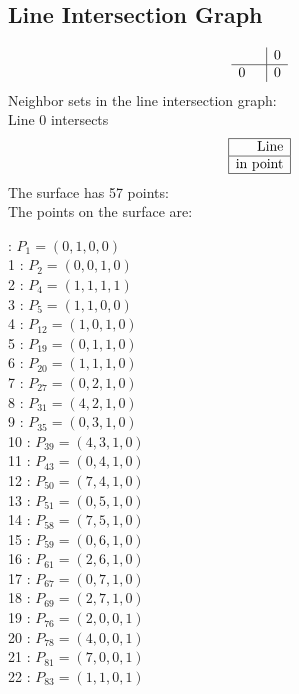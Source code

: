 \documentclass{article}
\begin{document}
{\subsection*{Line Intersection Graph}
{\arraycolsep=1pt
$$
\begin{array}{rr|*{1}r}
 &  & 0\\
\hline
0 &  & 0\\
\end{array}
$$
}%
Neighbor sets in the line intersection graph:\\
Line 0 intersects 
$$
\begin{array}{|r*{0}{|c}|}
\hline
\mbox{Line} \\
\hline
\mbox{in point} \\
\hline
\end{array}
$$
The surface has 57 points:\\
The points on the surface are:\\
\begin{multicols}{3}
 : $P_{1}=( 0, 1, 0, 0 )$\\
1 : $P_{2}=( 0, 0, 1, 0 )$\\
2 : $P_{4}=( 1, 1, 1, 1 )$\\
3 : $P_{5}=( 1, 1, 0, 0 )$\\
4 : $P_{12}=( 1, 0, 1, 0 )$\\
5 : $P_{19}=( 0, 1, 1, 0 )$\\
6 : $P_{20}=( 1, 1, 1, 0 )$\\
7 : $P_{27}=( 0, 2, 1, 0 )$\\
8 : $P_{31}=( 4, 2, 1, 0 )$\\
9 : $P_{35}=( 0, 3, 1, 0 )$\\
10 : $P_{39}=( 4, 3, 1, 0 )$\\
11 : $P_{43}=( 0, 4, 1, 0 )$\\
12 : $P_{50}=( 7, 4, 1, 0 )$\\
13 : $P_{51}=( 0, 5, 1, 0 )$\\
14 : $P_{58}=( 7, 5, 1, 0 )$\\
15 : $P_{59}=( 0, 6, 1, 0 )$\\
16 : $P_{61}=( 2, 6, 1, 0 )$\\
17 : $P_{67}=( 0, 7, 1, 0 )$\\
18 : $P_{69}=( 2, 7, 1, 0 )$\\
19 : $P_{76}=( 2, 0, 0, 1 )$\\
20 : $P_{78}=( 4, 0, 0, 1 )$\\
21 : $P_{81}=( 7, 0, 0, 1 )$\\
22 : $P_{83}=( 1, 1, 0, 1 )$\\

\end{multicols}}
\end{document}
